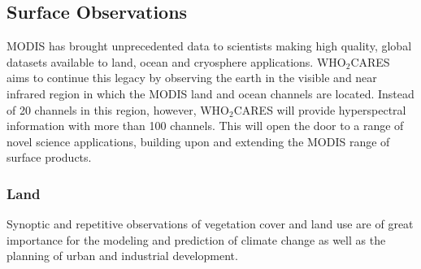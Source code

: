 \documentclass{scrartcl}
\newcommand{\whocares}{WHO$_2$CARES }
\begin{document}
\subsection{Surface Observations}
\label{sec:org147f3dd}


MODIS has brought unprecedented data to scientists making
high quality, global datasets available to land, ocean and cryosphere
applications. \whocares aims to continue this legacy by observing the earth
in the visible and near infrared region in which the MODIS land and ocean
channels are located. Instead of 20 channels in this region, however,
\whocares will provide hyperspectral information with more than 100 channels.
This will open the door to a range of novel science applications, building upon
and extending the MODIS range of surface products.

\subsubsection{Land}
\label{sec:org188f852}

Synoptic and repetitive observations of vegetation cover and land use are
of great importance for the modeling and prediction of climate change as
well as the planning of urban and industrial development.
\end{document}
